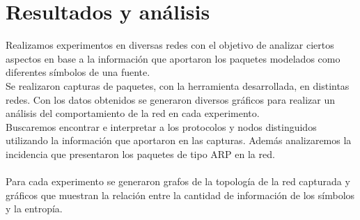 \section{Resultados y análisis}
Realizamos experimentos en diversas redes con el objetivo de analizar ciertos aspectos en base a la información que aportaron los paquetes modelados como diferentes símbolos de una fuente.
\\
Se realizaron capturas de paquetes, con la herramienta desarrollada, en distintas redes. Con los datos obtenidos se generaron diversos gráficos para realizar un análisis del comportamiento de la red en cada experimento.
\\
Buscaremos encontrar e interpretar a los protocolos y nodos distinguidos utilizando la información que aportaron en las capturas. Además analizaremos la incidencia que presentaron los paquetes de tipo ARP en la red.
\\\\
Para cada experimento se generaron grafos de la topología de la red capturada y gráficos que muestran la relación entre la cantidad de información de los símbolos y la entropía.